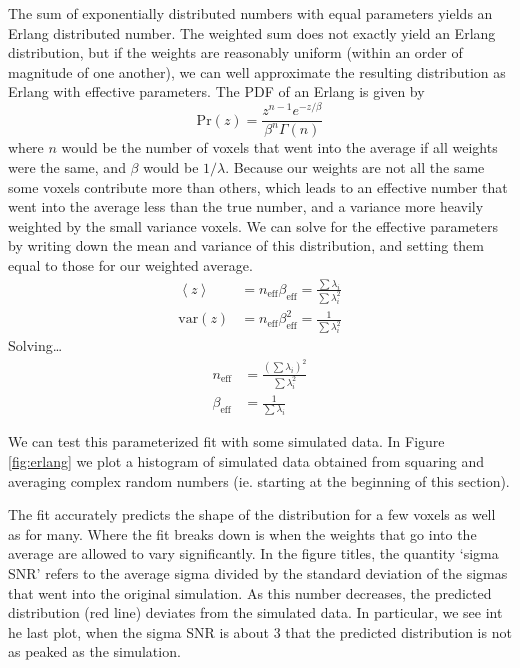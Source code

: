 \documentclass{article}
\begin{document}
The sum of exponentially distributed numbers with equal parameters yields an Erlang distributed number. The weighted sum does not exactly yield an Erlang distribution, but if the weights are reasonably uniform (within an order of magnitude of one another), we can well approximate the resulting distribution as Erlang with effective parameters. The PDF of an Erlang is given by
\begin{equation}\label{eq:erlang}
\mathrm{Pr}(z) = \frac{z^{n-1} e^{-z/\beta}}{\beta^n \Gamma(n)}
\end{equation}
where $n$ would be the number of voxels that went into the average if all weights were the same, and $\beta$ would be $1/\lambda$. Because our weights are not all the same some voxels contribute more than others, which leads to an effective number that went into the average less than the true number, and a variance more heavily weighted by the small variance voxels. We can solve for the effective parameters by writing down the mean and variance of this distribution, and setting them equal to those for our weighted average.
\begin{subequations}
\begin{align}
\left<z \right> & = n_{\mathrm{eff}} \beta_{\mathrm{eff}} = \frac{\sum\lambda_i}{\sum \lambda_i^2} \\
\mathrm{var}(z) & = n_{\mathrm{eff}} \beta_{\mathrm{eff}}^2 = \frac{1}{\sum \lambda_i^2}
\end{align}
\end{subequations}
Solving\ldots
\begin{subequations}\label{eq:erlang_params}
\begin{align}
n_{\mathrm{eff}} & = \frac{\left(\sum\lambda_i\right)^2}{\sum \lambda_i^2} \\
\beta_{\mathrm{eff}} & = \frac{1}{\sum\lambda_i}
\end{align}
\end{subequations}

We can test this parameterized fit with some simulated data. In Figure \ref{fig:erlang} we plot a histogram of simulated data obtained from squaring and averaging complex random numbers (ie. starting at the beginning of this section). 

The fit accurately predicts the shape of the distribution for a few voxels as well as for many. Where the fit breaks down is when the weights that go into the average are allowed to vary significantly. In the figure titles, the quantity `sigma SNR' refers to the average sigma divided by the standard deviation of the sigmas that went into the original simulation. As this number decreases, the predicted distribution (red line) deviates from the simulated data. In particular, we see int he last plot, when the sigma SNR is about 3 that the predicted distribution is not as peaked as the simulation.
\end{document}
